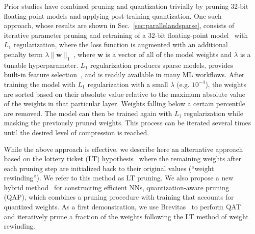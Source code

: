 \documentclass[tinyml]{acmart}
\newcommand{\norm}[1]{\|#1\|}
\renewcommand{\vec}[1]{\boldsymbol{#1}}
\begin{document}
Prior studies have combined pruning and quantization trivially by pruning 32-bit floating-point models and applying post-training quantization.
One such approach, whose results are shown in Sec.~\ref{sec:parallelandsparse}, consists of iterative parameter pruning and retraining of a 32-bit floating-point model~\cite{DBLP:journals/corr/HanPTD15,DBLP:journals/corr/HanMD15,Duarte:2018ite} with $L_1$ regularization, where the loss function is augmented with an additional penalty term $\lambda \norm{\vec w}_1~$, where $\vec w$ is a vector of all of the model weights and $\lambda$ is a tunable hyperparameter.
$L_1$ regularization produces sparse models, provides built-in feature selection~\cite{Ng:2004:FSL:1015330.1015435}, and is readily available in many ML workflows.
After training the model with $L_1$ regularization with a small $\lambda$ (e.g. $10^{-4}$), the weights are sorted based on their absolute value relative to the maximum absolute value of the weights in that particular layer.
Weights falling below a certain percentile are removed.
The model can then be trained again with $L_1$ regularization while masking the previously pruned weights.
This process can be iterated several times until the desired level of compression is reached.


While the above approach is effective, we describe here an alternative approach based on the lottery ticket (LT) hypothesis~\cite{lotteryticket} where the remaining weights after each pruning step are initialized back to their original values (``weight rewinding'').
We refer to this method as LT pruning.
We also propose a new hybrid method~\cite{Hawks:2021ruw} for constructing efficient NNs, quantization-aware pruning (QAP), which combines a pruning procedure with training that accounts for quantized weights.
As a first demonstration, we use Brevitas~\cite{brevitas} to perform QAT and iteratively prune a fraction of the weights following the LT method of weight rewinding.
\end{document}
